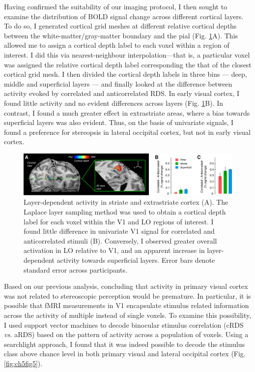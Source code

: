 Having confirmed the suitability of our imaging protocol, I then sought to examine the distribution of BOLD signal change across different cortical layers. To do so, I generated cortical grid meshes at different relative cortical depths between the white-matter/gray-matter boundary and the pial (Fig. \ref{fig:ch5fig4}A). This allowed me to assign a cortical depth label to each voxel within a region of interest. I did this via nearest-neighbour interpolation---that is, a particular voxel was assigned the relative cortical depth label corresponding the that of the closest cortical grid mesh. I then divided the cortical depth labels in three bins --- deep, middle and superficial layers --- and finally looked at the difference between activity evoked by correlated and anticorrelated RDS. In early visual cortex, I found little activity and no evident differences across layers (Fig. \ref{fig:ch5fig4}B). In contrast, I found a much greater effect in extrastriate areas, where a bias towards superficial layers was also evident. Thus, on the basis of univariate signals, I found a preference for stereopsis in lateral occipital cortex, but not in early visual cortex.

\begin{figure}
  \centering
  \includegraphics[keepaspectratio,width=14cm]{Fig4.pdf}
  \caption[Layer-dependent activity in striate and extrastriate cortex.]{Layer-dependent activity in striate and extrastriate cortex (A). The Laplace layer sampling method \cite{Jones:2000cr} was used to obtain a cortical depth label for each voxel within the V1 and LO regions of interest. I found little difference in univariate V1 signal for correlated and anticorrelated stimuli (B). Conversely, I observed greater overall activation in LO relative to V1, and an apparent increase in layer-dependent activity towards superficial layers. Error bars denote standard error across participants.}
  \label{fig:ch5fig4}
\end{figure}

Based on our previous analysis, concluding that activity in primary visual cortex was not related to stereoscopic perception would be premature. In particular, it is possible that fMRI measurements in V1 encapsulate stimulus related information across the activity of multiple instead of single voxels. To examine this possibility, I used support vector machines to decode binocular stimulus correlation (cRDS \textit{vs.} aRDS) based on the pattern of activity across a population of voxels. Using a searchlight approach, I found that it was indeed possible to decode the stimulus class above chance level in both primary visual and lateral occipital cortex (Fig. \ref{fig:ch5fig5}).

